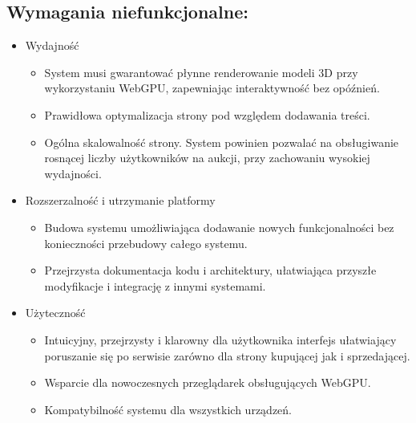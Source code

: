 \subsection{Wymagania niefunkcjonalne:}
\begin{itemize}
    \item Wydajność
          \begin{itemize}
              \item System musi gwarantować płynne renderowanie modeli 3D przy wykorzystaniu WebGPU, zapewniając interaktywność bez opóźnień.
              \item Prawidłowa optymalizacja strony pod względem dodawania treści.
              \item Ogólna skalowalność strony. System powinien pozwalać na obsługiwanie rosnącej liczby użytkowników na aukcji, przy zachowaniu wysokiej wydajności.
          \end{itemize}
\end{itemize}
\begin{itemize}
    \item Rozszerzalność i utrzymanie platformy
          \begin{itemize}
              \item Budowa systemu umożliwiająca dodawanie nowych funkcjonalności bez konieczności przebudowy całego systemu.
              \item Przejrzysta dokumentacja kodu i architektury, ułatwiająca przyszłe modyfikacje i integrację z innymi systemami.
          \end{itemize}
\end{itemize}
\begin{itemize}
    \item Użyteczność
          \begin{itemize}
              \item Intuicyjny, przejrzysty i klarowny dla użytkownika interfejs ułatwiający poruszanie się po serwisie zarówno dla strony kupującej jak i sprzedającej.
              \item Wsparcie dla nowoczesnych przeglądarek obsługujących WebGPU.
              \item Kompatybilność systemu dla wszystkich urządzeń.
          \end{itemize}
\end{itemize}

